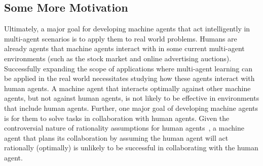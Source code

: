 \subsection{Some More Motivation}


Ultimately, a major goal for developing machine agents that act
intelligently in multi-agent scenarios is to apply them to real world
problems. Humans are already agents that machine agents interact with
in some current multi-agent environments (such as the stock
market and online advertising auctions). Successfully expanding the scope of applications where
multi-agent learning can be applied in the real world necessitates
studying how these agents interact with human agents. A machine agent
that interacts optimally against other machine agents, but not against
human agents, is not likely to be effective in environments that
include human agents. Further, one major goal of developing machine
agents is for them to solve tasks in collaboration with human
agents. Given the controversial nature of rationality assumptions for
human agents~\cite{kahnemanst82}, a machine agent that plans its
collaboration by assuming the human agent will act rationally
(optimally) is unlikely to be successful in collaborating with the
human agent.


